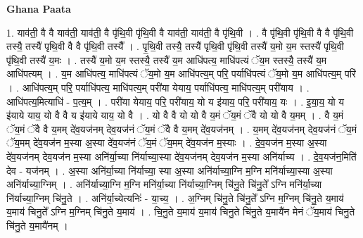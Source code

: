 \documentclass[17pt]{extarticle}
\begin{document}
\textbf{Ghana Paata } \newline

1. याव॑ती॒ वै वै याव॑ती॒ याव॑ती॒ वै पृ॑थि॒वी पृ॑थि॒वी वै याव॑ती॒ याव॑ती॒ वै पृ॑थि॒वी । . वै पृ॑थि॒वी पृ॑थि॒वी वै वै पृ॑थि॒वी तस्यै॒ तस्यै॑ पृथि॒वी वै वै पृ॑थि॒वी तस्यै᳚ । . पृ॒थि॒वी तस्यै॒ तस्यै॑ पृथि॒वी पृ॑थि॒वी तस्यै॑ य॒मो य॒म स्तस्यै॑ पृथि॒वी पृ॑थि॒वी तस्यै॑ य॒मः । . तस्यै॑ य॒मो य॒म स्तस्यै॒ तस्यै॑ य॒म आधि॑पत्य॒ माधि॑पत्यं ॅय॒म स्तस्यै॒ तस्यै॑ य॒म आधि॑पत्यम् । . य॒म आधि॑पत्य॒ माधि॑पत्यं ॅय॒मो य॒म आधि॑पत्य॒म् परि॒ पर्याधि॑पत्यं ॅय॒मो य॒म आधि॑पत्य॒म् परि॑ । . आधि॑पत्य॒म् परि॒ पर्याधि॑पत्य॒ माधि॑पत्य॒म् परी॑या येयाय॒ पर्याधि॑पत्य॒ माधि॑पत्य॒म् परी॑याय । . आधि॑पत्य॒मित्याधि॑ - प॒त्य॒म् । . परी॑या येयाय॒ परि॒ परी॑याय॒ यो य इ॑याय॒ परि॒ परी॑याय॒ यः । . इ॒या॒य॒ यो य इ॑याये याय॒ यो वै वै य इ॑याये याय॒ यो वै । . यो वै वै यो यो वै य॒मं ॅय॒मं ॅवै यो यो वै य॒मम् । . वै य॒मं ॅय॒मं ॅवै वै य॒मम् दे॑व॒यज॑नम् देव॒यज॑नं ॅय॒मं ॅवै वै य॒मम् दे॑व॒यज॑नम् । . य॒मम् दे॑व॒यज॑नम् देव॒यज॑नं ॅय॒मं ॅय॒मम् दे॑व॒यज॑न म॒स्या अ॒स्या दे॑व॒यज॑नं ॅय॒मं ॅय॒मम् दे॑व॒यज॑न म॒स्याः । . दे॒व॒यज॑न म॒स्या अ॒स्या दे॑व॒यज॑नम् देव॒यज॑न म॒स्या अनि॑र्या॒च्या नि॑र्याच्या॒स्या दे॑व॒यज॑नम् देव॒यज॑न म॒स्या अनि॑र्याच्य । . दे॒व॒यज॑न॒मिति॑ देव - यज॑नम् । . अ॒स्या अनि॑र्या॒च्या नि॑र्याच्या॒ स्या अ॒स्या अनि॑र्याच्या॒ग्नि म॒ग्नि मनि॑र्याच्या॒स्या अ॒स्या अनि॑र्याच्या॒ग्निम् । . अनि॑र्याच्या॒ग्नि म॒ग्नि मनि॑र्या॒च्या नि॑र्याच्या॒ग्निम् चि॑नु॒ते चि॑नु॒ते᳚ ऽग्नि मनि॑र्या॒च्या नि॑र्याच्या॒ग्निम् चि॑नु॒ते । . अनि॑र्या॒च्येत्यनिः॑ - या॒च्य॒ । . अ॒ग्निम् चि॑नु॒ते चि॑नु॒ते᳚ ऽग्नि म॒ग्निम् चि॑नु॒ते य॒माय॑ य॒माय॑ चिनु॒ते᳚ ऽग्नि म॒ग्निम् चि॑नु॒ते य॒माय॑ । . चि॒नु॒ते य॒माय॑ य॒माय॑ चिनु॒ते चि॑नु॒ते य॒मायै॑न मेनं ॅय॒माय॑ चिनु॒ते चि॑नु॒ते य॒मायै॑नम् । \newline
\end{document}
